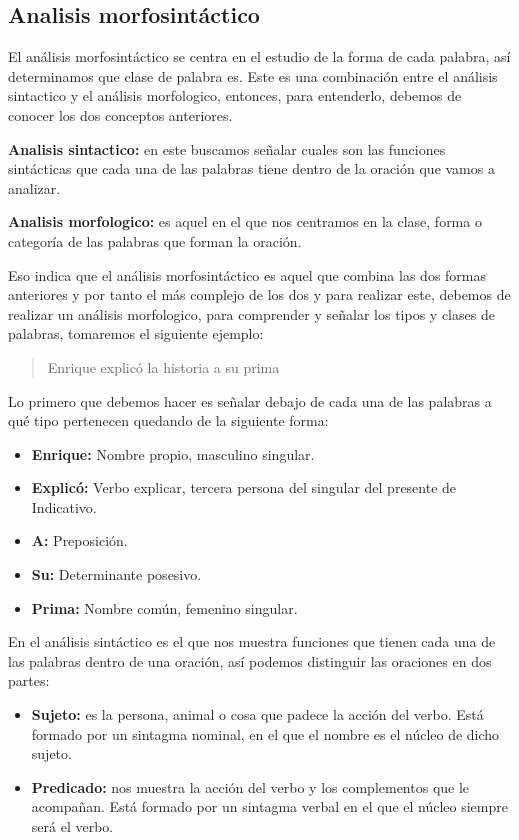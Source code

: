 \subsection{Analisis morfosintáctico}

El análisis morfosintáctico se centra en el estudio de la forma de cada palabra, así determinamos que clase de palabra es. Este es una combinación entre el análisis sintactico y el análisis morfologico, entonces, para entenderlo, debemos de conocer los dos conceptos anteriores.

\textbf{Analisis sintactico:} en este buscamos señalar cuales son las funciones sintácticas que cada una de las palabras tiene dentro de la oración que vamos a analizar.

\textbf{Analisis morfologico:} es aquel en el que nos centramos en la clase, forma o categoría de las palabras que forman la oración.

Eso indica que el análisis morfosintáctico es aquel que combina las dos formas anteriores y por tanto el más complejo de los dos y para realizar este, debemos de realizar un análisis morfologico, para comprender y señalar los tipos y clases de palabras, tomaremos el siguiente ejemplo:

\begin{quote}
    Enrique explicó la historia a su prima
\end{quote}

Lo primero que debemos hacer es señalar debajo de cada una de las palabras a qué tipo pertenecen quedando de la siguiente forma:
\begin{itemize}
    \item \textbf{Enrique:} Nombre propio, masculino singular.
    \item \textbf{Explicó:} Verbo explicar, tercera persona del singular del presente de Indicativo.
    \item \textbf{A:} Preposición.
    \item \textbf{Su:} Determinante posesivo.
    \item \textbf{Prima:} Nombre común, femenino singular.
\end{itemize}

En el análisis sintáctico es el que nos muestra funciones que tienen cada una de las palabras dentro de una oración, así podemos distinguir las oraciones en dos partes:
\begin{itemize}
    \item \textbf{Sujeto:} es la persona, animal o cosa que padece la acción del verbo. Está formado por un sintagma nominal, en el que el nombre es el núcleo de dicho sujeto.
    \item \textbf{Predicado:} nos muestra la acción del verbo y los complementos que le acompañan. Está formado por un sintagma verbal en el que el núcleo siempre será el verbo.
\end{itemize}

